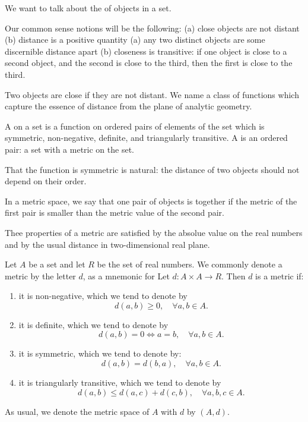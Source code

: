 
\sbasic



\sstart



We want to talk
about the 
of objects in a set.


Our common sense notions
will be the following:
(a) close objects are not
distant
(b) distance is a positive
quantity
(a) any two distinct objects
are some discernible distance apart
(b) closeness is transitive: if one object is close
to a second object, and the second
is close to the third, then the
first is close to the third.

Two objects are close
if they are not distant.
We name a class of functions
which capture the
essence of distance
from the
plane of analytic geometry.

A
on a set
is a function
on ordered pairs of elements
of the set which
is symmetric, non-negative,
definite, and triangularly
transitive.
A 
is an ordered
pair: a set with
a metric on the set.

That the function is symmetric
is natural: the distance of
two objects should not depend
on their order.

In a metric space,
we say that one pair
of objects is 
together if
the metric
of the first pair
is smaller than the
metric value of the
second pair.

Thee properties
of a metric are satisfied
by the absolue value
on the real numbers and
by the usual distance
in two-dimensional real plane.


Let $A$ be a set
and let $R$ be the set
of real numbers.
We commonly denote
a metric by the letter
$d$, as a mnemonic
for 
Let $d: A \times A \to R$.
Then $d$ is a metric if:
\begin{enumerate}
  \item
    it is non-negative,
    which we tend to denote by
    $$
      d(a, b) \geq 0, \quad \forall a,b \in A.
    $$
  \item
    it is definite, which we tend to denote
    by
    $$
      d(a, b) = 0 \Leftrightarrow a = b, \quad \forall a,b \in A.
    $$

  \item
    it is symmetric, which we tend to denote by:
    $$
      d(a, b) = d(b, a), \quad \forall a,b \in A.
    $$
  \item
    it is triangularly transitive, which we tend to
    denote by
    $$
      d(a, b) \leq d(a, c) + d(c, b), \quad \forall a,b,c \in A.
    $$
\end{enumerate}
As usual, we denote the metric space
of $A$ with $d$ by
$(A, d)$.


\strats

